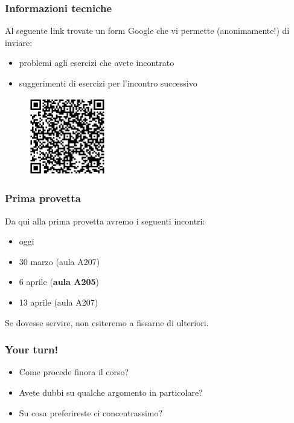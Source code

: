\documentclass{beamer}
\begin{document}
\begin{frame}[fragile]
	\frametitle{Informazioni tecniche}
	
	Al seguente link trovate un form Google che vi permette (anonimamente!) di inviare:
	
	\begin{itemize}
	    \item problemi agli esercizi che avete incontrato
	    \item suggerimenti di esercizi per l'incontro successivo
	\end{itemize}
	
	\begin{figure}
	    \centering
	    \includegraphics[width=0.3\textwidth]{drawable/logos/qr.png}
	\end{figure}
    
\end{frame} 

\begin{frame}[fragile]
	\frametitle{Prima provetta}
	
	Da qui alla prima provetta avremo i seguenti incontri:
	
	\begin{itemize}
	    \item oggi
	    \item 30 marzo (aula A207)
	    \item 6 aprile (\textbf{aula A205})
	    \item 13 aprile (aula A207)
	\end{itemize}
	
	\medskip
	
	Se dovesse servire, non esiteremo a fissarne di ulteriori.
	
    
\end{frame} 

\begin{frame}[fragile]
	\frametitle{Your turn!}
	
	\begin{itemize}
	    \item Come procede finora il corso?
	    \item Avete dubbi su qualche argomento in particolare?
	    \item Su cosa preferireste ci concentrassimo?
	\end{itemize}
    
\end{frame} 
\end{document}
